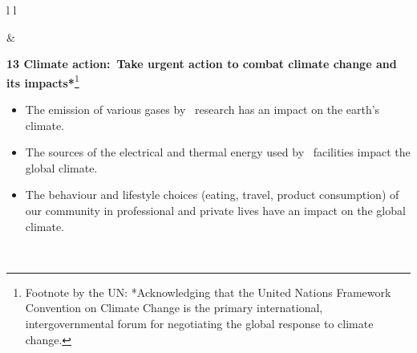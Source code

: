 \documentclass[../SustainableHEP.tex]{subfiles}
\begin{document}
\begin{longtable*}{l l}
\parbox[t]{\SDGleft\textwidth}{} & \savenotes\parbox[t]{\SDGright\textwidth}{\textbf{13 Climate action:\ Take urgent action to combat climate change and its impacts*}\footnote{Footnote by the UN: *Acknowledging that the United Nations Framework Convention on Climate Change is the primary international, intergovernmental forum for negotiating the global response to climate change.}
\begin{itemize}[leftmargin=20pt]
\item The emission of various gases by \ACR\ research has an impact on the earth’s climate.
\item The sources of the electrical and thermal energy used by \ACR\ facilities impact the global climate.
\item The behaviour and lifestyle choices (eating, travel, product consumption) of our community in professional and private lives have an impact on the global climate.
\end{itemize}}\spewnotes\\


\end{longtable*}
\end{document}
